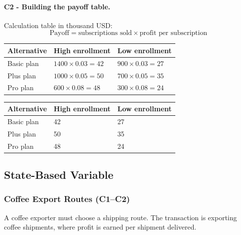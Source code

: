 	\paragraph*{C2 - Building the payoff table.}
	\label{subsec:problem7-rural-internet-subscriptions-c2}
	Calculation table in thousand USD:
	\[
	\text{Payoff}=\text{subscriptions sold}\times\text{profit per subscription}
	\]
	\begin{center}
		\begin{tabular}{lll}
			\toprule
			Alternative & High enrollment & Low enrollment \\
			\midrule
			Basic plan & $1400 \times 0.03 = 42$ & $900 \times 0.03 = 27$ \\
			Plus plan & $1000 \times 0.05 = 50$ & $700 \times 0.05 = 35$ \\
			Pro plan & $600 \times 0.08 = 48$ & $300 \times 0.08 = 24$ \\
			\bottomrule
		\end{tabular}
	\end{center}

	\begin{center}
		\begin{tabular}{lll}
			\toprule
			Alternative & High enrollment & Low enrollment \\
			\midrule
			Basic plan & 42 & 27 \\
			Plus plan & 50 & 35 \\
			Pro plan & 48 & 24 \\
			\bottomrule
		\end{tabular}
	\end{center}


	\subsection{State-Based Variable}
	\label{sec:state-based-variable-payoff-profit-per-item-times-number-of-items}


	\subsubsection{Coffee Export Routes (C1--C2)}
	\label{sec:problem8-coffee-export-routes-c1-c2}
	A coffee exporter must choose a shipping route. The transaction is exporting coffee shipments, where profit is earned per shipment delivered.

